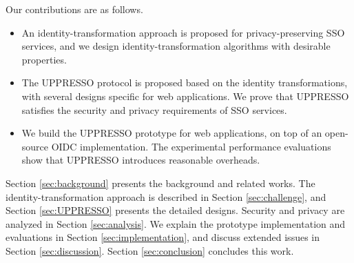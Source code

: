 Our contributions are as follows.
\vspace{-\topsep}\begin{itemize}
\setlength{\topsep}{0pt}
\setlength{\partopsep}{0pt}
\setlength{\itemsep}{0pt}
\setlength{\parsep}{0pt}
\setlength{\parskip}{0pt}
\item An identity-transformation approach is proposed for privacy-preserving SSO services,
        and we design identity-transformation algorithms with desirable properties.
\item
The UPPRESSO protocol is proposed based on the identity transformations,
    with several designs specific for web applications.
We prove that UPPRESSO satisfies the security and privacy requirements of SSO services.

\item
We build the UPPRESSO prototype for web applications,
    on top of an open-source OIDC implementation.
The experimental performance evaluations show that UPPRESSO introduces reasonable overheads.
\end{itemize}


Section \ref{sec:background} presents
    the background and related works.
The identity-transformation approach is described in Section \ref{sec:challenge},
    and Section \ref{sec:UPPRESSO} presents the detailed designs.
Security and privacy are analyzed in Section \ref{sec:analysis}.
We explain the prototype implementation and evaluations in Section \ref{sec:implementation},
 and discuss extended issues in Section \ref{sec:discussion}.
Section \ref{sec:conclusion} concludes this work.
